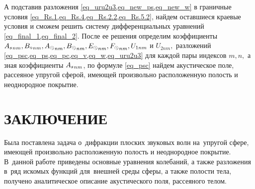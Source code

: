 А подставив разложения \cref{eq_uru2u3,eq_new_ps,eq_new_w} в граничные условия \cref{eq_Rs.1,eq_Rs.4,eq_Rs.2.2,eq_Rs.5.2}, найдем оставшиеся краевые условия и сможем решить  систему дифференциальных уравнений \cref{eq_final_1,eq_final_2}. После ее решения определим коэффициенты \\
${A\sc}_{nm}, {B\c}_{nm}, {A\s}_{nm}, {B\s}_{nm}, {E\s}_{nm}, {F\s}_{nm}, {U}_{1nm}$ и ${U}_{2nm},$ разложений  \cref{eq_psc,eq_ps,eq_pc,eq_v,eq_w,eq_uru2u3} для каждой пары индексов $m,n,$ а зная коэффициенты ${A\sc}_{nm}$, по формуле \cref{eq_psc} найдем акустическое поле, рассеяное упругой сферой, имеющей произвольно расположенную полость и неоднородное покрытие.

\newpage
\section*{ЗАКЛЮЧЕНИЕ}
Была поставлена задача о~дифракции плоских звуковых волн на~упругой сфере, имеющей произвольно расположенную полость и неоднородное покрытие. В~данной работе приведены основные уравнения колебаний, а также разложения в~ряд искомых функций для~внешней среды сферы, а также полости тела, получено аналитическое описание акустического поля, рассеяного телом.
